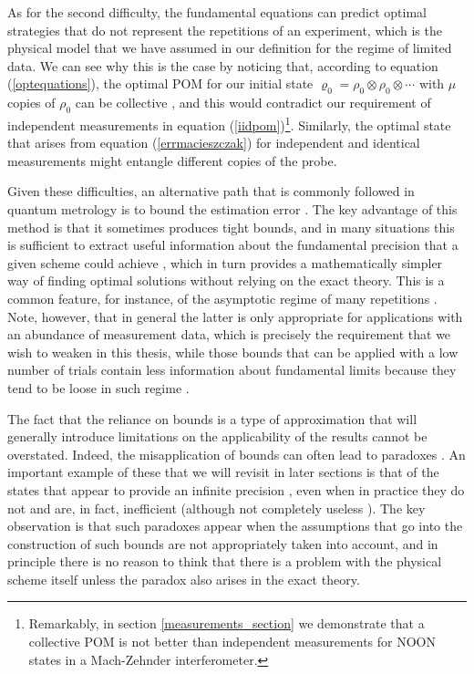 As for the second difficulty, the fundamental equations can predict optimal strategies that do not represent the repetitions of an experiment, which is the physical model that we have assumed in our definition for the regime of limited data. We can see why this is the case by noticing that, according to equation (\ref{optequations}), the optimal POM for our initial state $\varrho_0 = \rho_0 \otimes \rho_0 \otimes \cdots$ with $\mu$ copies of $\rho_0$ can be collective \cite{jarzyna2016thesis}, and this would contradict our requirement of independent measurements in equation (\ref{iidpom})\footnote{Remarkably, in section \ref{measurements_section} we demonstrate that a collective POM is not better than independent measurements for NOON states in a Mach-Zehnder interferometer.}. Similarly, the optimal state that arises from equation (\ref{errmacieszczak}) for independent and identical measurements might entangle different copies of the probe. 

Given these difficulties, an alternative path that is commonly followed in quantum metrology is to bound the estimation error \cite{rafal2015, li2018, tsang2012, tsang2016, liu2016}. The key advantage of this method is that it sometimes produces tight bounds, and in many situations this is sufficient to extract useful information about the fundamental precision that a given scheme could achieve \cite{rafal2015, Szczykulska2016, haase2018jul}, which in turn provides a mathematically simpler way of finding optimal solutions without relying on the exact theory. This is a common feature, for instance, of the asymptotic regime of many repetitions \cite{rafal2015, jarzyna2015true, haase2018jul}. Note, however, that in general the latter is only appropriate for applications with an abundance of measurement data, which is precisely the requirement that we wish to weaken in this thesis, while those bounds that can be applied with a low number of trials contain less information about fundamental limits because they tend to be loose in such regime \cite{tsang2012, tsang2016}.

The fact that the reliance on bounds is a type of approximation that will generally introduce limitations on the applicability of the results cannot be overstated. Indeed, the misapplication of bounds can often lead to paradoxes \cite{li2018}. An important example of these that we will revisit in later sections is that of the states that appear to provide an infinite precision \cite{rivas2012, zhang2013}, even when in practice they do not and are, in fact, inefficient \cite{tsang2012, giovannetti2012subheisenberg, berry2012infinite, pezze2013, rafal2015} (although not completely useless \cite{alfredo2017}). The key observation is that such paradoxes appear when the assumptions that go into the construction of such bounds are not appropriately taken into account, and in principle there is no reason to think that there is a problem with the physical scheme itself unless the paradox also arises in the exact theory. 

